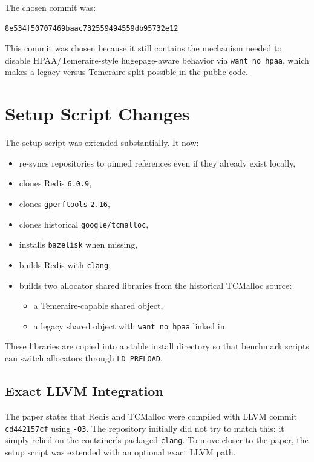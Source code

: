 \documentclass[a4paper,11pt]{article}
\begin{document}
The chosen commit was:

\begin{lstlisting}[style=codestyle]
8e534f50707469baac732559494559db95732e12
\end{lstlisting}

This commit was chosen because it still contains the mechanism needed to disable HPAA/Temeraire-style hugepage-aware behavior via \texttt{want\_no\_hpaa}, which makes a legacy versus Temeraire split possible in the public code.

\section{Setup Script Changes}

The setup script was extended substantially.
It now:

\begin{itemize}[leftmargin=1.5em]
  \item re-syncs repositories to pinned references even if they already exist locally,
  \item clones Redis \texttt{6.0.9},
  \item clones \texttt{gperftools} \texttt{2.16},
  \item clones historical \texttt{google/tcmalloc},
  \item installs \texttt{bazelisk} when missing,
  \item builds Redis with \texttt{clang},
  \item builds two allocator shared libraries from the historical TCMalloc source:
  \begin{itemize}[leftmargin=1.5em]
    \item a Temeraire-capable shared object,
    \item a legacy shared object with \texttt{want\_no\_hpaa} linked in.
  \end{itemize}
\end{itemize}

These libraries are copied into a stable install directory so that benchmark scripts can switch allocators through \texttt{LD\_PRELOAD}.

\subsection{Exact LLVM Integration}

The paper states that Redis and TCMalloc were compiled with LLVM commit
\texttt{cd442157cf} using \texttt{-O3}. The repository initially did not try to
match this: it simply relied on the container's packaged \texttt{clang}. To
move closer to the paper, the setup script was extended with an optional exact
LLVM path.
\end{document}

